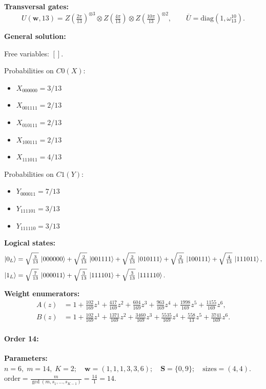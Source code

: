 \documentclass[11pt]{article}
\begin{document}
\noindent\textbf{Transversal gates:}
\[
    U(\mathbf w,13)=Z \left(\tfrac{2\pi}{13}\right)^{\otimes3} \otimes Z \left(\tfrac{4\pi}{13}\right) \otimes Z \left(\tfrac{10\pi}{13}\right)^{\otimes2},\qquad
    \overline U=\mathrm{diag}(1,\omega_{13}^{10}).
\]

\noindent\textbf{General solution:}

Free variables: $[]$.

Probabilities on $C0 (X)$:
\begin{itemize}
    \item $X_{000000} = 3/13$
    \item $X_{001111} = 2/13$
    \item $X_{010111} = 2/13$
    \item $X_{100111} = 2/13$
    \item $X_{111011} = 4/13$
\end{itemize}

Probabilities on $C1 (Y)$:
\begin{itemize}
    \item $Y_{000011} = 7/13$
    \item $Y_{111101} = 3/13$
    \item $Y_{111110} = 3/13$
\end{itemize}

\noindent\textbf{Logical states:}
\begin{align*}
\ket{0_L} &= \sqrt{\tfrac{3}{13}}\,\ket{000000} + \sqrt{\tfrac{2}{13}}\,\ket{001111} + \sqrt{\tfrac{2}{13}}\,\ket{010111} + \sqrt{\tfrac{2}{13}}\,\ket{100111} + \sqrt{\tfrac{4}{13}}\,\ket{111011},
\\[2pt]
\ket{1_L} &= \sqrt{\tfrac{7}{13}}\,\ket{000011} + \sqrt{\tfrac{3}{13}}\,\ket{111101} + \sqrt{\tfrac{3}{13}}\,\ket{111110}.
\end{align*}

\noindent\textbf{Weight enumerators:}
\begin{align*}
A(z) &= 1 + \tfrac{102}{169}z^{1} + \tfrac{417}{169}z^{2} + \tfrac{604}{169}z^{3} + \tfrac{963}{169}z^{4} + \tfrac{1998}{169}z^{5} + \tfrac{1155}{169}z^{6},\\[2pt]
B(z) &= 1 + \tfrac{102}{169}z^{1} + \tfrac{1371}{169}z^{2} + \tfrac{3460}{169}z^{3} + \tfrac{5535}{169}z^{4} + \tfrac{558}{13}z^{5} + \tfrac{3741}{169}z^{6}.
\end{align*}

\paragraph{\textbf{Order 14:}}
\noindent\textbf{Parameters:} $n=6,\; m=14,\; K=2;\quad \mathbf w=(1, 1, 1, 3, 3, 6);\quad \mathbf S=\{0, 9\};\quad \text{sizes}=\left(4, 4\right).$ $\displaystyle \text{order}=\frac{m}{\gcd(m,s_1,\dots,s_{K-1})}=\frac{14}{1}=14.$
\end{document}
